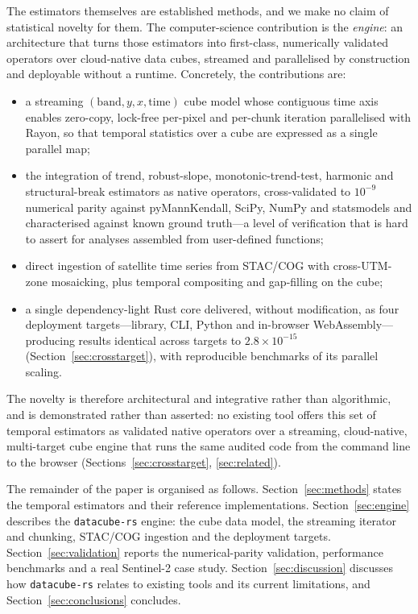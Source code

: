 \documentclass[review]{elsarticle}
\begin{document}
The estimators themselves are established methods, and we make no claim of
statistical novelty for them. The computer-science contribution is the
\emph{engine}: an architecture that turns those estimators into first-class,
numerically validated operators over cloud-native data cubes, streamed and
parallelised by construction and deployable without a runtime. Concretely, the
contributions are:
\begin{itemize}
  \item a streaming $(\text{band}, y, x, \text{time})$ cube model whose
  contiguous time axis enables zero-copy, lock-free per-pixel and per-chunk
  iteration parallelised with Rayon, so that temporal statistics over a cube are
  expressed as a single parallel map;
  \item the integration of trend, robust-slope, monotonic-trend-test, harmonic
  and structural-break estimators as native operators, cross-validated to
  $10^{-9}$ numerical parity against pyMannKendall, SciPy, NumPy and statsmodels
  and characterised against known ground truth---a level of verification that is
  hard to assert for analyses assembled from user-defined functions;
  \item direct ingestion of satellite time series from STAC/COG with
  cross-UTM-zone mosaicking, plus temporal compositing and gap-filling on the
  cube;
  \item a single dependency-light Rust core delivered, without modification, as
  four deployment targets---library, CLI, Python and in-browser
  WebAssembly---producing results identical across targets to $2.8\times10^{-15}$
  (Section~\ref{sec:crosstarget}), with reproducible benchmarks of its parallel
  scaling.
\end{itemize}
The novelty is therefore architectural and integrative rather than
algorithmic, and is demonstrated rather than asserted: no existing tool offers
this set of temporal estimators as validated native operators over a
streaming, cloud-native, multi-target cube engine that runs the same audited
code from the command line to the browser (Sections~\ref{sec:crosstarget},
\ref{sec:related}).

The remainder of the paper is organised as follows.
Section~\ref{sec:methods} states the temporal estimators and their reference
implementations. Section~\ref{sec:engine} describes the \texttt{datacube-rs}
engine: the cube data model, the streaming iterator and chunking, STAC/COG
ingestion and the deployment targets. Section~\ref{sec:validation} reports the
numerical-parity validation, performance benchmarks and a real Sentinel-2 case
study. Section~\ref{sec:discussion} discusses how \texttt{datacube-rs} relates to
existing tools and its current limitations, and Section~\ref{sec:conclusions}
concludes.
\end{document}
